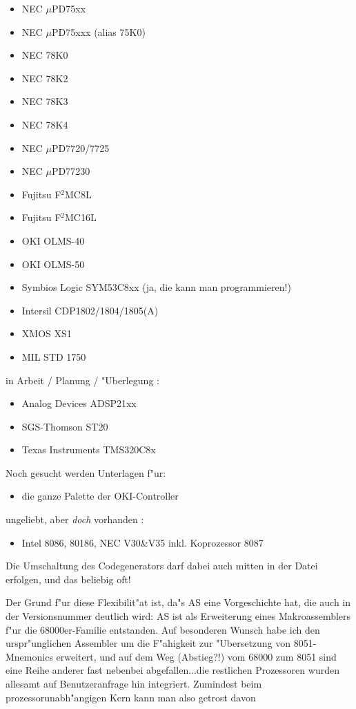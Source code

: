 \documentclass[12pt,a4paper,twoside]{report}
\begin{document}
\begin{itemize}
\item{NEC $\mu$PD75xx}
\item{NEC $\mu$PD75xxx (alias 75K0)}
\item{NEC 78K0}
\item{NEC 78K2}
\item{NEC 78K3}
\item{NEC 78K4}
\item{NEC $\mu$PD7720/7725}
\item{NEC $\mu$PD77230}
\item{Fujitsu F$^2$MC8L}
\item{Fujitsu F$^2$MC16L}
\item{OKI OLMS-40}
\item{OKI OLMS-50}
\item{Symbios Logic SYM53C8xx (ja, die kann man programmieren!)}
\item{Intersil CDP1802/1804/1805(A)}
\item{XMOS XS1}
\item{MIL STD 1750}
\end{itemize}
in Arbeit / Planung / "Uberlegung :
\begin{itemize}
\item{Analog Devices ADSP21xx}
\item{SGS-Thomson ST20}
\item{Texas Instruments TMS320C8x}
\end{itemize}
Noch gesucht werden Unterlagen f"ur:
\begin{itemize}
\item{die ganze Palette der OKI-Controller}
\end{itemize}
ungeliebt, aber {\it doch} vorhanden :
\begin{itemize}
\item{Intel 8086, 80186, NEC V30\&V35 inkl. Koprozessor 8087}
\end{itemize}
Die Umschaltung des Codegenerators darf dabei auch mitten in der Datei
erfolgen, und das beliebig oft!
\par
Der Grund f"ur diese Flexibilit"at ist, da"s AS eine Vorgeschichte hat,
die auch in der Versionsnummer deutlich wird: AS ist als Erweiterung eines
Makroassemblers f"ur die 68000er-Familie entstanden.  Auf besonderen
Wunsch habe ich den urspr"unglichen Assembler um die F"ahigkeit zur
"Ubersetzung von 8051-Mnemonics erweitert, und auf dem Weg (Abstieg?!) vom
68000 zum 8051 sind eine Reihe anderer fast nebenbei abgefallen...die
restlichen Prozessoren wurden allesamt auf Benutzeranfrage hin integriert.
Zumindest beim prozessorunabh"angigen Kern kann man also getrost davon
\end{document}
